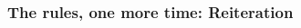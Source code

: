 \begin{frame}
  \begin{fitchproof}
    \open
    \open
    \open
    \close
    \close
    \close
  \end{fitchproof}
\end{frame}

\begin{frame}
  \frametitle{The rules, one more time: Reiteration}
\begin{columns}
  \begin{column}{3cm}
    \begin{fitchproof}
       
    \end{fitchproof}
    \begin{fitchproof}
       
    \end{fitchproof}
  \end{column}
  \begin{column}{3cm}
  \begin{fitchproof}
    \open
    \ellipsesline
    \close
     
  \end{fitchproof}
    \end{column}
\end{columns}
\end{frame}

